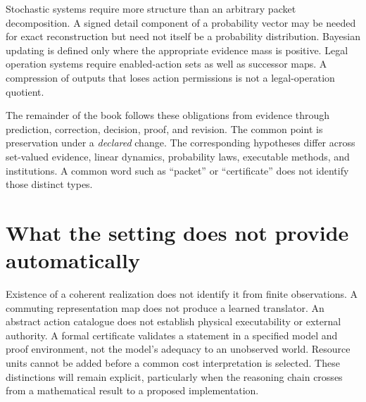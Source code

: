 Stochastic systems require more structure than an arbitrary packet decomposition. A signed detail component of a probability vector may be needed for exact reconstruction but need not itself be a probability distribution. Bayesian updating is defined only where the appropriate evidence mass is positive. Legal operation systems require enabled-action sets as well as successor maps. A compression of outputs that loses action permissions is not a legal-operation quotient.

The remainder of the book follows these obligations from evidence through prediction, correction, decision, proof, and revision. The common point is preservation under a \emph{declared} change. The corresponding hypotheses differ across set-valued evidence, linear dynamics, probability laws, executable methods, and institutions. A common word such as ``packet'' or ``certificate'' does not identify those distinct types.

\section*{What the setting does not provide automatically}
Existence of a coherent realization does not identify it from finite observations. A commuting representation map does not produce a learned translator. An abstract action catalogue does not establish physical executability or external authority. A formal certificate validates a statement in a specified model and proof environment, not the model's adequacy to an unobserved world. Resource units cannot be added before a common cost interpretation is selected. These distinctions will remain explicit, particularly when the reasoning chain crosses from a mathematical result to a proposed implementation.

\renewcommand{\thetheorem}{\thechapter.\arabic{theorem}}
